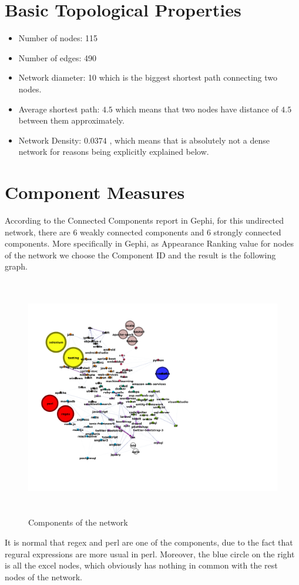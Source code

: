 \documentclass[12pt]{article}
\begin{document}
	\section{Basic Topological Properties}
		\begin{itemize}
			\item Number of nodes: 115
			\item Number of edges: 490
			\item Network diameter: 10 which is the biggest shortest path connecting two nodes.
			\item Average shortest path: $4.5$ which means that two nodes have distance of $4.5$ between them approximately.
			\item Network Density: $0.0374$ , which means that is absolutely not a dense network for reasons being explicitly explained below. 
		\end{itemize}
		
	
   \section{Component Measures}
      According to the Connected Components report in Gephi, for this undirected network, there are 6 weakly connected components and 6 strongly connected components. More specifically in Gephi, as Appearance Ranking value for nodes of the network we choose the Component ID and the result is the following graph.  
      	\begin{figure}[ht]
	      	\centering
	      	\includegraphics[width=20cm,height=10.5cm]{components}
	      	\caption{Components of the network}
      \end{figure}
      \FloatBarrier
      It is normal that regex and perl are one of the components, due to the fact that regural expressions are more usual in perl. Moreover, the blue circle on the right is all the excel nodes, which obviously has nothing in common with the rest nodes of the network. 
      
\end{document}
